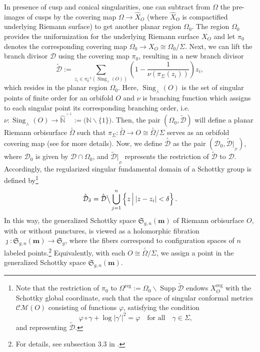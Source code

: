 \documentclass[a4paper,11pt]{article}
\newcommand{\schottky}{\mathfrak{S}}
\newcommand{\SchottkyFund}{\mathcal{D}}
\newcommand{\sing}{\operatorname{Sing}}
\newcommand{\orderrange}{\hat{\mathbb{N}}^{^{>1}}}
\newcommand{\brdiv}{\mathscr{D}}
\newcommand{\singrigon}{\overset{{}_{\curlywedge}}{\Omega}}
\newcommand{\singfund}{\overset{{}_{\curlywedge}}{\mathcal{D}}}
\begin{document}
In presence of cusp and conical singularities, 
one can subtract from $\Omega$ the pre-images  of cusps by the covering map $\Omega \to \hat{X}_O$ (where $\hat{X}_O$ is compactified underlying Riemann surface) to get another planar region $\Omega_0$. The region  $\Omega_0$ provides the uniformization for the underlying Riemann surface  $X_O$ and let $\pi_{0}$ denotes the corresponding covering map $\Omega_0 \to X_O \cong \Omega_0/\Sigma$. Next, we can lift the branch divisor $\brdiv$
using the covering map $\pi_{0}$, resulting in a new branch divisor
\begin{equation}
\widetilde{\brdiv} := \sum_{z_i \in \pi_{0}^{-1}(\sing_{\curlywedge}(O))} \left(1-\frac{1}{\nu\left(\pi_{\Sigma}(z_i)\right)}\right) z_i,
\end{equation}
which resides in the planar region $\Omega_0$. Here, $\sing_{\curlywedge}(O)$ is the set of singular points of finite order for an orbifold $O$ and $\nu$ is branching function which assigns to each singular point its corresponding branching order, i.e. $\nu: \sing_{\curlywedge}(O) \to \orderrange :=\big(\mathbb{N}\backslash\{1\}\big) $.  Then, the pair $(\Omega_0,\widetilde{\brdiv})$ will define a planar Riemann orbisurface $\singrigon$ such that $\pi_{\Sigma}:\singrigon \to O \cong \singrigon/\Sigma$ serves as an orbifold covering map (see \cite{Wong-1971} for more details). 
Now, we define $\singfund$ as the pair $(\SchottkyFund_0 , \widetilde{\brdiv}|_{_{\SchottkyFund}})$, where $\SchottkyFund_0$ is given by $\SchottkyFund \cap \Omega_0$, and $\widetilde{\brdiv}|_{_{\SchottkyFund}}$ represents the restriction of $\widetilde{\brdiv}$ to $\SchottkyFund$. Accordingly, the regularized singular fundamental domain of a Schottky group is defined by\footnote{Note that the restriction of $\pi_0$ to $\Omega^{\text{reg}} := \Omega_0 \backslash \operatorname{Supp}\widetilde{\brdiv}$ endows $X_O^{\text{reg}}$ with the Schottky global coordinate, such that the space of singular conformal metrics  $\mathscr{CM}(O)$ consisting of functions $\varphi$, satisfying the condition
	\begin{equation}\label{Schottkycovariant}
	\varphi \circ \gamma + \log|\gamma'|^2 = \varphi \quad \text{for all} \quad \gamma \in \Sigma,\nonumber
	\end{equation}
	and representing $\widetilde{\brdiv}$.}
\begin{equation}
\singfund_{\delta} = \singfund \big\backslash  \bigcup_{j=1}^{n}\left\{z \, \Big| \, |z-z_i|<\delta\right\}.
\end{equation} 
In this way, the generalized Schottky space $\schottky_{g,n}(\boldsymbol{m})$ of Riemann orbisurface $O$, with or without punctures, is viewed as a holomorphic fibration  $\jmath : \schottky_{g,n}(\boldsymbol{m}) \to \schottky_{g}$, where the fibers correspond to configuration spaces of $n$ labeled points.\footnote{For details, see subsection 3.3 in \cite{Taghavi2024classical}.} Equivalently, with each $O \cong \singrigon/\Sigma$, we assign a point in the generalized Schottky space $\schottky_{g,n}(\boldsymbol{m})$.
\end{document}
